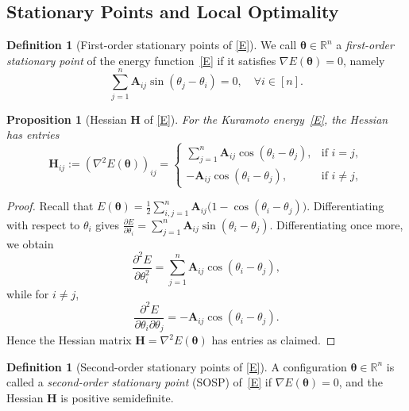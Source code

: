 \documentclass[11pt,reqno]{amsart}
\newtheorem{proposition}[theorem]{Proposition}
\theoremstyle{definition}
\newtheorem{definition}[theorem]{Definition}
\begin{document}
\subsection{Stationary Points and Local Optimality}
\begin{definition}[First-order stationary points of \eqref{E}]\label{stationaryy}
We call $\boldsymbol\theta\in\mathbb{R}^n$ a \emph{first-order stationary point} of the energy function~\eqref{E}
if it satisfies $\nabla E(\boldsymbol\theta) = 0$, namely
\begin{equation}\label{stationary}
    \sum_{j=1}^n \boldsymbol{A}_{ij}\sin(\theta_j-\theta_i)=0,
    \quad \forall i\in[n].
\end{equation}
\end{definition}

\begin{proposition}[Hessian $\boldsymbol{H}$ of \eqref{E}]\label{hessian}
For the Kuramoto energy~\eqref{E}, the Hessian has entries
\[
\boldsymbol{H}_{ij}:=(\nabla^2 E(\boldsymbol{\theta}))_{ij} =
\begin{cases}
    \sum_{j=1}^n \boldsymbol{A}_{ij} \cos(\theta_i - \theta_j), & \text{if } i = j, \\[8pt]
    -\boldsymbol{A}_{ij} \cos(\theta_i - \theta_j), & \text{if } i \neq j, \end{cases}
\]
\end{proposition}

\begin{proof}
Recall that $E(\boldsymbol\theta)=\frac12\sum_{i,j=1}^n \boldsymbol{A}_{ij}\bigl(1-\cos(\theta_i-\theta_j)\bigr)$. Differentiating with respect to $\theta_i$ gives $\frac{\partial E}{\partial \theta_i}=
\sum_{j=1}^n \boldsymbol{A}_{ij}\sin(\theta_i-\theta_j)$. Differentiating once more, we obtain
\[
\frac{\partial^2 E}{\partial \theta_i^2}
=
\sum_{j=1}^n \boldsymbol{A}_{ij}\cos(\theta_i-\theta_j),
\]
while for $i\neq j$,
\[
\frac{\partial^2 E}{\partial \theta_i\partial \theta_j}
=
- \boldsymbol{A}_{ij}\cos(\theta_i-\theta_j).
\]
Hence the Hessian matrix $\mathbf H=\nabla^2 E(\boldsymbol\theta)$ has entries as claimed.
\end{proof}

\begin{definition}[Second-order stationary points of \eqref{E}]
A configuration $\boldsymbol\theta\in\mathbb R^n$ is called a \emph{second-order stationary point} (SOSP) of~\eqref{E} if $\nabla E(\boldsymbol\theta) = 0$, and the Hessian $\boldsymbol{H}$ is positive semidefinite.
\end{definition}
\end{document}
